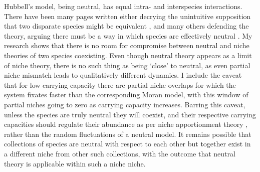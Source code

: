 Hubbell's model, being neutral, has equal intra- and interspecies interactions. 
There have been many pages written either decrying the unintuitive supposition that two disparate species might be equivalent \cite{Ricklefs2006,Kalyuzhny2014,Carroll2015}, and many others defending the theory, arguing there must be a way in which species are effectively neutral \cite{Hubbell2006,Rosindell2011}. %
My research shows that there is no room for compromise between neutral and niche theories of two species coexisting. 
Even though neutral theory appears as a limit of niche theory, there is no such thing as being `close' to neutral, as even partial niche mismatch leads to qualitatively different dynamics. 
I include the caveat that for low carrying capacity there are partial niche overlaps for which the system fixates faster than the corresponding Moran model, with this window of partial niches going to zero as carrying capacity increases. %
Barring this caveat, unless the species are truly neutral they will coexist, and their respective carrying capacities should regulate their abundance as per niche apportionment theory \cite{MacArthur1957,Sugihara2003,Leibold1995}, rather than the random fluctuations of a neutral model. 
It remains possible that collections of species are neutral with respect to each other but together exist in a different niche from other such collections, with the outcome that neutral theory is applicable within such a niche niche. 

